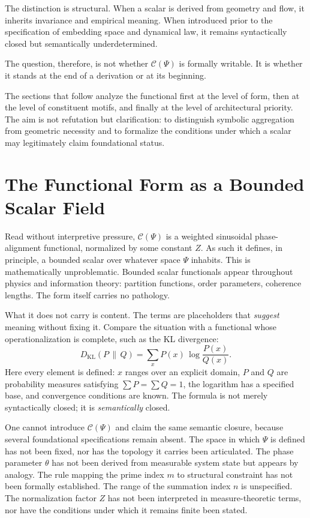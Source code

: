 \documentclass[12pt]{article}
\begin{document}
The distinction is structural. When a scalar is derived from geometry and flow, it inherits invariance and empirical meaning. When introduced prior to the specification of embedding space and dynamical law, it remains syntactically closed but semantically underdetermined.

The question, therefore, is not whether $\mathcal{C}(\Psi)$ is formally writable. It is whether it stands at the end of a derivation or at its beginning.

The sections that follow analyze the functional first at the level of form, then at the level of constituent motifs, and finally at the level of architectural priority. The aim is not refutation but clarification: to distinguish symbolic aggregation from geometric necessity and to formalize the conditions under which a scalar may legitimately claim foundational status.

\section{The Functional Form as a Bounded Scalar Field}

Read without interpretive pressure, $\mathcal{C}(\Psi)$ is a weighted sinusoidal phase-alignment functional, normalized by some constant $Z$. As such it defines, in principle, a bounded scalar over whatever space $\Psi$ inhabits. This is mathematically unproblematic. Bounded scalar functionals appear throughout physics and information theory: partition functions, order parameters, coherence lengths. The form itself carries no pathology.

What it does not carry is content. The terms are placeholders that \emph{suggest} meaning without fixing it. Compare the situation with a functional whose operationalization is complete, such as the KL divergence:
\[
  D_{\mathrm{KL}}(P \,\|\, Q) = \sum_x P(x)\,\log\frac{P(x)}{Q(x)}.
\]
Here every element is defined: $x$ ranges over an explicit domain, $P$ and $Q$ are probability measures satisfying $\sum P = \sum Q = 1$, the logarithm has a specified base, and convergence conditions are known. The formula is not merely syntactically closed; it is \emph{semantically} closed.

One cannot introduce $\mathcal{C}(\Psi)$ and claim the same semantic closure, because several foundational specifications remain absent. The space in which $\Psi$ is defined has not been fixed, nor has the topology it carries been articulated. The phase parameter $\theta$ has not been derived from measurable system state but appears by analogy. The rule mapping the prime index $m$ to structural constraint has not been formally established. The range of the summation index $n$ is unspecified. The normalization factor $Z$ has not been interpreted in measure-theoretic terms, nor have the conditions under which it remains finite been stated.
\end{document}
